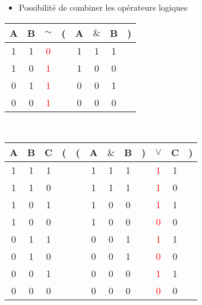 \documentclass[12pt,a4paper]{article}
\begin{document}
	\begin{itemize}
		\item Possibilité de combiner les opérateurs logiques
	\end{itemize}

	\begin{tabular}{@{ }c@{ }@{ }c | c@{ }@{}c@{}@{ }c@{ }@{ }c@{ }@{ }c@{ }@{}c@{ }}
		A & B & $\sim$ & ( & A & $\&$ & B & )\\
		\hline 
		1 & 1 & \textcolor{red}{0} &  & 1 & 1 & 1 & \\
		1 & 0 & \textcolor{red}{1} &  & 1 & 0 & 0 & \\
		0 & 1 & \textcolor{red}{1} &  & 0 & 0 & 1 & \\
		0 & 0 & \textcolor{red}{1} &  & 0 & 0 & 0 & \\
	\end{tabular}

	\ \\

	\begin{tabular}{@{ }c@{ }@{ }c@{ }@{ }c | c@{}@{}c@{}@{ }c@{ }@{ }c@{ }@{ }c@{ }@{}c@{}@{ }c@{ }@{ }c@{ }@{}c@{ }}
		A & B & C & ( & ( & A & $\&$ & B & ) & $\lor$ & C & )\\
		\hline 
		1 & 1 & 1 &  &  & 1 & 1 & 1 &  & \textcolor{red}{1} & 1 & \\
		1 & 1 & 0 &  &  & 1 & 1 & 1 &  & \textcolor{red}{1} & 0 & \\
		1 & 0 & 1 &  &  & 1 & 0 & 0 &  & \textcolor{red}{1} & 1 & \\
		1 & 0 & 0 &  &  & 1 & 0 & 0 &  & \textcolor{red}{0} & 0 & \\
		0 & 1 & 1 &  &  & 0 & 0 & 1 &  & \textcolor{red}{1} & 1 & \\
		0 & 1 & 0 &  &  & 0 & 0 & 1 &  & \textcolor{red}{0} & 0 & \\
		0 & 0 & 1 &  &  & 0 & 0 & 0 &  & \textcolor{red}{1} & 1 & \\
		0 & 0 & 0 &  &  & 0 & 0 & 0 &  & \textcolor{red}{0} & 0 & \\
	\end{tabular}
\end{document}
